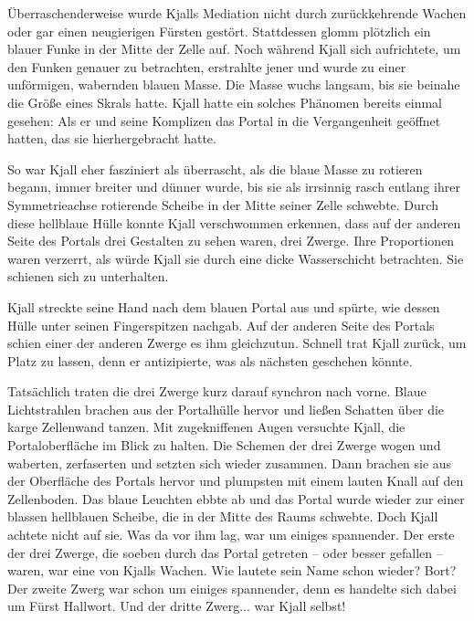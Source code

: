 \trennzeichen



Überraschenderweise wurde Kjalls Mediation nicht durch zurückkehrende Wachen oder gar einen neugierigen Fürsten gestört. Stattdessen glomm plötzlich ein blauer Funke in der Mitte der Zelle auf. Noch während Kjall sich aufrichtete, um den Funken genauer zu betrachten, erstrahlte jener und wurde zu einer unförmigen, wabernden blauen Masse. Die Masse wuchs langsam, bis sie beinahe die Größe eines Skrals hatte. Kjall hatte ein solches Phänomen bereits einmal gesehen: Als er und seine Komplizen das Portal in die Vergangenheit geöffnet hatten, das sie hierhergebracht hatte.

So war Kjall eher fasziniert als überrascht, als die blaue Masse zu rotieren begann, immer breiter und dünner wurde, bis sie als irrsinnig rasch entlang ihrer Symmetrieachse rotierende Scheibe in der Mitte seiner Zelle schwebte. Durch diese hellblaue Hülle konnte Kjall verschwommen erkennen, dass auf der anderen Seite des Portals drei Gestalten zu sehen waren, drei Zwerge. Ihre Proportionen waren verzerrt, als würde Kjall sie durch eine dicke Wasserschicht betrachten. Sie schienen sich zu unterhalten.

Kjall streckte seine Hand nach dem blauen Portal aus und spürte, wie dessen Hülle unter seinen Fingerspitzen nachgab. Auf der anderen Seite des Portals schien einer der anderen Zwerge es ihm gleichzutun. Schnell trat Kjall zurück, um Platz zu lassen, denn er antizipierte, was als nächsten geschehen könnte.

Tatsächlich traten die drei Zwerge kurz darauf synchron nach vorne. Blaue Lichtstrahlen brachen aus der Portalhülle hervor und ließen Schatten über die karge Zellenwand tanzen. Mit zugekniffenen Augen versuchte Kjall, die Portaloberfläche im Blick zu halten. Die Schemen der drei Zwerge wogen und waberten, zerfaserten und setzten sich wieder zusammen. Dann brachen sie aus der Oberfläche des Portals hervor und plumpsten mit einem lauten Knall auf den Zellenboden. Das blaue Leuchten ebbte ab und das Portal wurde wieder zur einer blassen hellblauen Scheibe, die in der Mitte des Raums schwebte. Doch Kjall achtete nicht auf sie. Was da vor ihm lag, war um einiges spannender. Der erste der drei Zwerge, die soeben durch das Portal getreten – oder besser gefallen – waren, war eine von Kjalls Wachen. Wie lautete sein Name schon wieder? Bort? Der zweite Zwerg war schon um einiges spannender, denn es handelte sich dabei um Fürst Hallwort. Und der dritte Zwerg... war Kjall selbst!


